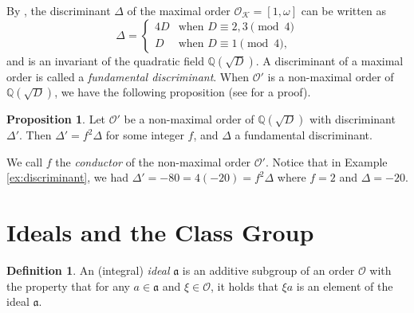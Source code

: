 \documentclass{ucalgthes1}
\theoremstyle{definition}
\newtheorem{prop}[thm]{Proposition}
\newtheorem{defn}[thm]{Definition}
\newcommand{\QQ}{\mathbb{Q}}
\newcommand{\KK}{\mathcal{K}}
\newcommand{\OO}{\mathcal{O}}
\newcommand{\ideal}{\mathfrak}
\begin{document}
By \cite[p.13]{Ramachandran2006}, the discriminant $\Delta$ of the maximal order $\OO_\KK = [1, \omega]$ can be written as
\begin{equation}
\label{eq:radicandToDiscriminant}
\Delta = \begin{cases}
	4D & \textrm{when } D \equiv 2, 3 \pmod 4 \\
	D  & \textrm{when } D \equiv 1 \pmod 4,
\end{cases}
\end{equation}
and is an invariant of the quadratic field $\QQ(\sqrt D)$.  A discriminant of a maximal order is called a \emph{fundamental discriminant}.  When $\OO'$ is a non-maximal order of $\QQ(\sqrt D)$, we have the following proposition (see \cite[p.216]{Cohn1980} for a proof).

\begin{prop}
Let $\OO'$ be a non-maximal order of $\QQ(\sqrt D)$ with discriminant $\Delta'$.  Then $\Delta' = f^2 \Delta$ for some integer $f$, and $\Delta$ a fundamental discriminant.
\end{prop}

\noindent
We call $f$ the \emph{conductor} of the non-maximal order $\OO'$.  Notice that in Example \ref{ex:discriminant}, we had $\Delta' = -80 = 4(-20) = f^2\Delta$ where $f = 2$ and $\Delta = -20$.


\section{Ideals and the Class Group}
\label{sec:classGroup}

\begin{defn} \cite[Definition 4.20]{Jacobson2009}
An (integral) \emph{ideal} $\ideal a$ is an additive subgroup of an order $\OO$ with the property that for any $a \in \ideal a$ and $\xi \in \OO$, it holds that $\xi a$ is an element of the ideal $\ideal a$.
\end{defn}
\end{document}
